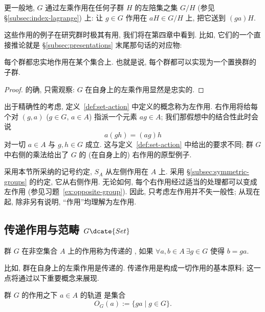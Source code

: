 \begin{example}
\label{ex:cosets-action}
更一般地, $G$ 通过左乘作用在任何子群 $H$ 的左陪集之集 $G/H$ (参见 \S\ref{subsec:index-lagrange}) 上: 让 $g \in G$ 作用在 $aH \in G/H$ 上, 把它送到 $(ga)H$.
\end{example}

这些作用的例子在研究群时极其有用, 我们将在第四章中看到. 比如, 它们的一个直接推论就是 \S\ref{subsec:presentations} 末尾那句话的对应物:

\begin{theorem}[Cayley 定理]
\label{thm:cayley}
每个群都忠实地作用在某个集合上. 也就是说, 每个群都可以实现为一个置换群的子群.
\end{theorem}

\begin{proof}
的确, 只需观察: $G$ 在自身上的左乘作用显然是忠实的.
\end{proof}

出于精确性的考虑, 定义~\ref{def:set-action} 中定义的概念称为左作用. 右作用将给每个对 $(g, a)$ ($g \in G$, $a \in A$) 指派一个元素 $ag \in A$; 我们那假想中的结合性此时会说
\[
a(gh) = (ag)h
\]
对一切 $a \in A$ 与 $g, h \in G$ 成立. 这与定义~\ref{def:set-action} 中给出的要求不同; 群 $G$ 中右侧的乘法给出了 $G$ 的 (在自身上的) 右作用的原型例子.

采用本节所采纳的记号约定, $S_A$ 从左侧作用在 $A$ 上. 采用 \S\ref{subsec:symmetric-groups} 的约定, 它从右侧作用. 无论如何, 每个右作用经过适当的处理都可以变成左作用 (参见习题~\ref{ex:opposite-group}). 因此, 只考虑左作用并不失一般性; 从现在起, 除非另有说明, ``作用''均理解为左作用.

\subsection{\texorpdfstring{传递作用与范畴 $G\dcate{Set}$}{传递作用与范畴 G-Set}}
\label{subsec:transitive-actions}

\begin{definition}
\label{def:transitive}
群 $G$ 在非空集合 $A$ 上的作用称为传递的%
, 如果 $\forall a, b \in A\ \exists g \in G$ 使得 $b = ga$.
\end{definition}

比如, 群在自身上的左乘作用是传递的. 传递作用是构成一切作用的基本原料; 这一点将通过以下重要概念来展现.

\begin{definition}
\label{def:orbit}
群 $G$ 的作用之下 $a \in A$ 的轨道%
是集合
\[
O_G(a) := \{ga \mid g \in G\}.
\]
\end{definition}

